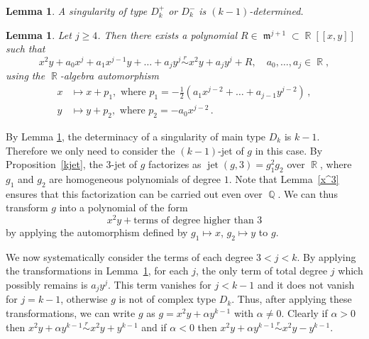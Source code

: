 \documentclass[noend]{amsproc}
\newtheorem{lemma}[theorem]{Lemma}
\theoremstyle{definition}
\newcommand{\requiv}{\ensuremath{\mathrel{\overset{r}{\sim}}}}
\DeclareMathOperator{\m}{\mathfrak{m}}
\DeclareMathOperator{\jet}{jet}
\DeclareMathOperator{\Q}{\mathbb{Q}}
\DeclareMathOperator{\R}{\mathbb{R}}
\begin{document}
\begin{lemma}\label{kDeterminacyD[k]k>4}
A singularity of type $D_k^+$ or $D_k^-$ is $(k-1)$-determined.
\end{lemma}

\begin{lemma}\label{transformationD[k]}
Let $j \geq 4$. Then there exists a polynomial
$R \in \m^{j+1} \subset \R[[x, y]]$ such that
\[
x^2y + a_0 x^j + a_1 x^{j-1}y + \ldots + a_j y^j \requiv x^2y + a_j y^j + R,
\quad a_0, \ldots, a_j \in \R,
\]
using the $\R$-algebra automorphism
\begin{align*}
x &\mapsto x + p_1, \text{ where }
p_1 = -\frac{1}{2} (a_1 x^{j-2} + \ldots + a_{j-1} y^{j-2}) \,, \\
y &\mapsto y + p_2, \text{ where }
p_2 = -a_0 x^{j-2} \,.
\end{align*}
\end{lemma}

By Lemma \ref{kDeterminacyD[k]k>4}, the determinacy of a singularity of main
type $D_k$ is $k-1$. Therefore we only need to consider the $(k-1)$-jet of $g$
in this case. By Proposition~\ref{kjet}, the $3$-jet of $g$ factorizes as
$\jet(g, 3) = g_1^2g_2$ over $\R$, where $g_1$ and $g_2$ are homogeneous
polynomials of degree $1$. Note that Lemma~\ref{x^3} ensures that this
factorization can be carried out even over $\Q$. We can thus transform $g$ into
a polynomial of the form
\[
x^2y + \text{terms of degree higher than $3$}
\]
by applying the automorphism defined by $g_1\mapsto x$, $g_2\mapsto y$ to $g$.

We now systematically consider the terms of each degree $3<j<k$. By applying
the transformations in Lemma~\ref{transformationD[k]}, for each $j$, the only
term of total degree $j$ which possibly remains is $a_jy^j$. This term vanishes
for $j<k-1$ and it does not vanish for $j=k-1$, otherwise $g$ is not of complex
type $D_k$. Thus, after applying these transformations, we can write $g$ as
$g=x^2y+\alpha y^{k-1}$ with $\alpha \neq 0$. Clearly if $\alpha>0$ then
$x^2y+\alpha y^{k-1}\requiv x^2y+y^{k-1}$ and if $\alpha<0$ then
$x^2y+\alpha y^{k-1}\requiv x^2y-y^{k-1}$.
\end{document}

